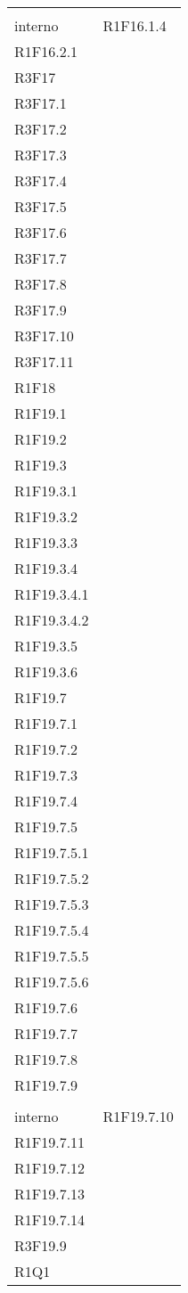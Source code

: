 \begin{longtable}{ >{\centering}p{}
		>{\centering}p{}}
	\tabularnewline \rowcolorlight &	\tabularnewline
	interno & R1F16.1.4 \\R1F16.2.1 \\R3F17 \\R3F17.1 \\ R3F17.2 \\R3F17.3 \\R3F17.4 \\R3F17.5 \\R3F17.6 \\R3F17.7 \\R3F17.8 \\R3F17.9 \\R3F17.10 \\R3F17.11 \\R1F18 \\R1F19.1 \\R1F19.2 \\R1F19.3 \\R1F19.3.1 \\R1F19.3.2 \\R1F19.3.3 \\R1F19.3.4 \\R1F19.3.4.1 \\R1F19.3.4.2 \\R1F19.3.5 \\R1F19.3.6 \\R1F19.7 \\R1F19.7.1 \\R1F19.7.2 \\R1F19.7.3 \\R1F19.7.4 \\R1F19.7.5 \\R1F19.7.5.1 \\R1F19.7.5.2 \\R1F19.7.5.3 \\R1F19.7.5.4 \\R1F19.7.5.5 \\R1F19.7.5.6 \\R1F19.7.6 \\R1F19.7.7 \\R1F19.7.8 \\ R1F19.7.9 
		\tabularnewline \rowcolorlight &	\tabularnewline
		interno &  R1F19.7.10 \\R1F19.7.11\\R1F19.7.12\\R1F19.7.13 \\R1F19.7.14 \\R3F19.9 \\R1Q1 \tabularnewline
	

\end{longtable}

